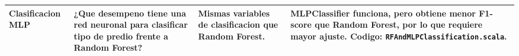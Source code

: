 \begin{longtable}{
  p{}
  p{}
  p{}
  p{}
}
\midrule

Clasificacion MLP &

¿Que desempeno tiene una red neuronal para clasificar tipo de predio frente a Random Forest? &

Mismas variables de clasificacion que Random Forest. &

MLPClassifier funciona, pero obtiene menor F1-score que Random Forest, por lo que requiere mayor ajuste. Codigo: \texttt{RFAndMLPClassification.scala}. \\

\bottomrule

\end{longtable}